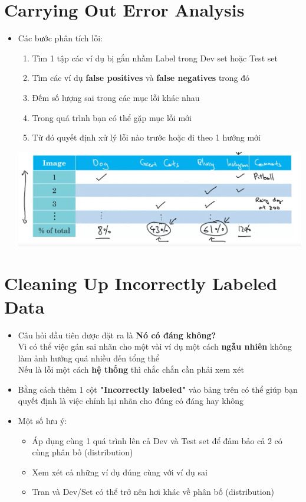 \documentclass[12pt,a4paper]{report}
\begin{document}
	\section{Carrying Out Error Analysis}
		\begin{itemize}
			\item Các bước phân tích lỗi:
				\begin{enumerate}
					\item Tìm 1 tập các ví dụ bị gắn nhầm Label trong Dev set hoặc Test set
					\item Tìm các ví dụ \textbf{false positives} và \textbf{false negatives} trong đó
					\item Đếm số lượng sai trong các mục lỗi khác nhau
					\item Trong quá trình bạn có thể gặp mục lỗi mới
					\item Từ đó quyết định xử lý lỗi nào trước hoặc đi theo 1 hướng mới
				\end{enumerate}
			\includegraphics[scale=0.4]{4}
		\end{itemize}
	\section{Cleaning Up Incorrectly Labeled Data}
		\begin{itemize}
			\item Câu hỏi đầu tiên được đặt ra là \textbf{Nó có đáng không?}\\Vì có thể việc gán sai nhãn cho một vài ví dụ một cách \textbf{ngẫu nhiên} không làm ảnh hưởng quá nhiều đến tổng thể\\Nếu là lỗi một cách \textbf{hệ thống} thì chắc chắn cần phải xem xét
			\item Bằng cách thêm 1 cột \textbf{"Incorrectly labeled"} vào bảng trên có thể giúp bạn quyết định là việc chỉnh lại nhãn cho đúng có đáng hay không
			\item Một số lưu ý:
				\begin{itemize}
					\item Áp dụng cùng 1 quá trình lên cả Dev và Test set để đảm bảo cả 2 có cùng phân bố (distribution)
					\item Xem xét cả những ví dụ đúng cùng với ví dụ sai
					\item Tran và Dev/Set có thể trở nên hơi khác về phân bố (distribution)
				\end{itemize}
		\end{itemize}
\end{document}
